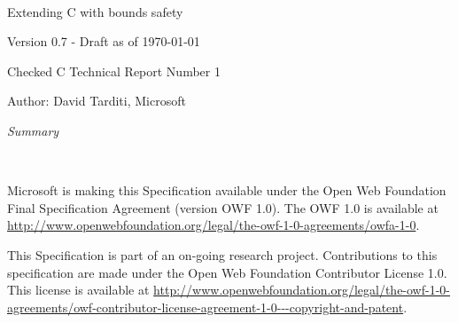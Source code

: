 \documentclass[11pt]{report}
\begin{document}
\begin{titlepage}
{\center
\mbox{ }\\
\vspace{2in}
{\huge Extending C with bounds safety \par}
{Version 0.7 - Draft as of \today \par}
\vspace{0.5in}
{Checked C Technical Report Number 1 \par}
\vspace{0.25in}
{Author: David Tarditi, Microsoft\par} 
\vspace{1in}
{\it Summary \par}

}
\end{titlepage}

\thispagestyle{empty}
\mbox{  }\\
\vspace{1.0in}

Microsoft is making this Specification available under the Open Web
Foundation Final Specification Agreement (version OWF 1.0).  The OWF 1.0
is available at {\color{blue} \url{http://www.openwebfoundation.org/legal/the-owf-1-0-agreements/owfa-1-0}}.

This Specification is part of an on-going research project.
Contributions to this specification
are made under the Open Web Foundation Contributor License 1.0. 
This license is available at {\color{blue} \url{http://www.openwebfoundation.org/legal/the-owf-1-0-agreements/owf-contributor-license-agreement-1-0---copyright-and-patent}}.

\newpage

\setcounter{page}{1}

\tableofcontents

\setcounter{page}{1}














\nocite{Jones2009}
\nocite{Jim2002}



\appendix
% 
% 
\end{document}
